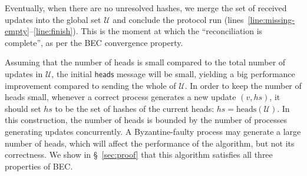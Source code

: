 \documentclass[a4paper,anonymous,USenglish]{lipics-v2019}
\begin{document}
Eventually, when there are no unresolved hashes, we merge the set of received updates into the global set $\mathcal{U}$ and conclude the protocol run (lines~\ref{line:missing-empty}--\ref{line:finish}).
This is the moment at which the ``reconciliation is complete'', as per the BEC convergence property.

Assuming that the number of heads is small compared to the total number of updates in $\mathcal{U}$, the initial $\mathsf{heads}$ message will be small, yielding a big performance improvement compared to sending the whole of $\mathcal{U}$.
In order to keep the number of heads small, whenever a correct process generates a new update $(v, \mathit{hs})$, it should set $\mathit{hs}$ to be the set of hashes of the current heads:
$\mathit{hs} = \mathrm{heads}(\mathcal{U})$.
In this construction, the number of heads is bounded by the number of processes generating updates concurrently.
A Byzantine-faulty process may generate a large number of heads, which will affect the performance of the algorithm, but not its correctness.
We show in \S~\ref{sec:proof} that this algorithm satisfies all three properties of BEC.
\end{document}
